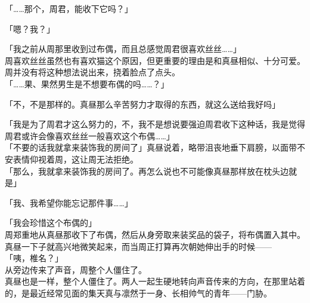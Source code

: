 「……那个，周君，能收下它吗？」

「嗯？我？」

「我之前从周那里收到过布偶，而且总感觉周君很喜欢丝丝……」\\

周喜欢丝丝虽然也有喜欢猫这个原因，但更重要的理由是和真昼相似、十分可爱。周并没有将这种想法说出来，挠着脸点了点头。\\

「……果、果然男生是不想要布偶的吗……？」

「不，不是那样的。真昼那么辛苦努力才取得的东西，就这么送给我好吗」

「我是为了周君才这么努力的，不，我不是想说要强迫周君收下这种话，我是觉得周君或许会像喜欢丝丝一般喜欢这个布偶……」\\

「不要的话我就拿来装饰我的房间了」真昼说着，略带沮丧地垂下肩膀，以面带不安表情仰视着周，这让周无法拒绝。\\

「那么，我就拿来装饰我的房间了。再怎么说也不可能像真昼那样放在枕头边就是」

「我、我希望你能忘记那件事……」

「我会珍惜这个布偶的」\\

周郑重地从真昼那收下了布偶，然后从身旁取来装奖品的袋子，将布偶置入其中。\\

真昼一下子就高兴地微笑起来，而当周正打算再次朝她伸出手的时候——\\

「咦，椎名？」\\

从旁边传来了声音，周整个人僵住了。\\

真昼也是一样，整个人僵住了。两人一起生硬地转向声音传来的方向，在那里站着的，是最近经常见面的集天真与凛然于一身、长相帅气的青年——门胁。
